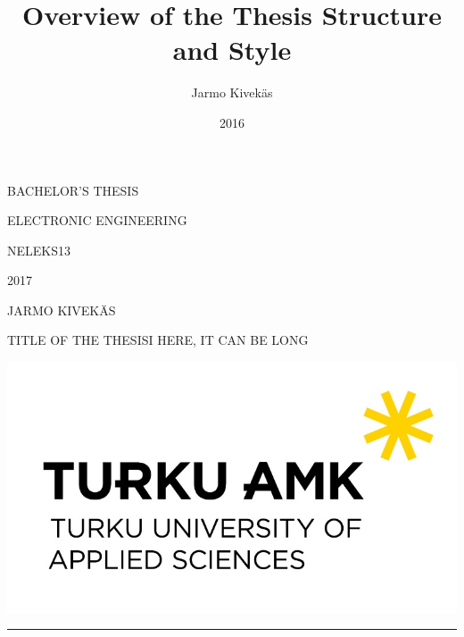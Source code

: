 \documentclass[11pt]{article}
\title{Overview of the Thesis Structure and Style}
\author{Jarmo Kivekäs}
\date{2016}
\begin{document}


\begin{titlepage}
    BACHELOR'S THESIS

    ELECTRONIC ENGINEERING

    NELEKS13

    2017

    {
        \addtolength{\leftskip}{0.886in}
    	\vspace{5cm}
        JARMO KIVEKÄS\par
    	{\Huge TITLE OF THE THESISI HERE, IT CAN BE LONG\par}
    }
    \vfill
    {
        \centering
    	\includegraphics{img/tuas-logo}\par\vspace{1cm}
    }
\end{titlepage}

\rule{\textwidth}{\textheight}
\end{document}

